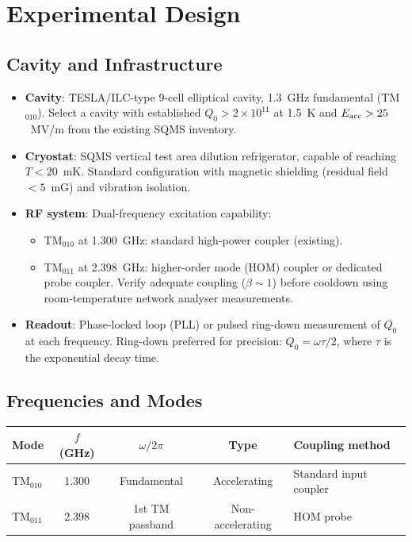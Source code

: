 \documentclass[11pt]{article}
\newcommand{\ee}[1]{\times 10^{#1}}
\begin{document}
\section{Experimental Design}
\label{sec:design}

\subsection{Cavity and Infrastructure}

\begin{itemize}
\item \textbf{Cavity}: TESLA/ILC-type 9-cell elliptical cavity,
  1.3~GHz fundamental (TM$_{010}$). Select a cavity with established
  $Q_0 > 2\ee{11}$ at 1.5~K and $E_{\rm acc} > 25$~MV/m from the
  existing SQMS inventory.

\item \textbf{Cryostat}: SQMS vertical test area dilution refrigerator,
  capable of reaching $T < 20$~mK. Standard configuration with magnetic
  shielding (residual field $< 5$~mG) and vibration isolation.

\item \textbf{RF system}: Dual-frequency excitation capability:
  \begin{itemize}[nosep]
  \item TM$_{010}$ at 1.300~GHz: standard high-power coupler (existing).
  \item TM$_{011}$ at 2.398~GHz: higher-order mode (HOM) coupler or
    dedicated probe coupler. Verify adequate coupling ($\beta \sim 1$)
    before cooldown using room-temperature network analyser measurements.
  \end{itemize}

\item \textbf{Readout}: Phase-locked loop (PLL) or pulsed ring-down
  measurement of $Q_0$ at each frequency. Ring-down preferred for
  precision: $Q_0 = \omega\tau/2$, where $\tau$ is the exponential
  decay time.
\end{itemize}

\subsection{Frequencies and Modes}

\begin{center}
\renewcommand{\arraystretch}{1.2}
\begin{tabular}{@{}lcccl@{}}
\toprule
\textbf{Mode} & $f$ (GHz) & $\omega/2\pi$ & \textbf{Type} &
\textbf{Coupling method} \\
\midrule
TM$_{010}$ & 1.300 & Fundamental & Accelerating & Standard input coupler \\
TM$_{011}$ & 2.398 & 1st TM passband & Non-accelerating & HOM probe \\
\bottomrule
\end{tabular}
\end{center}
\end{document}
